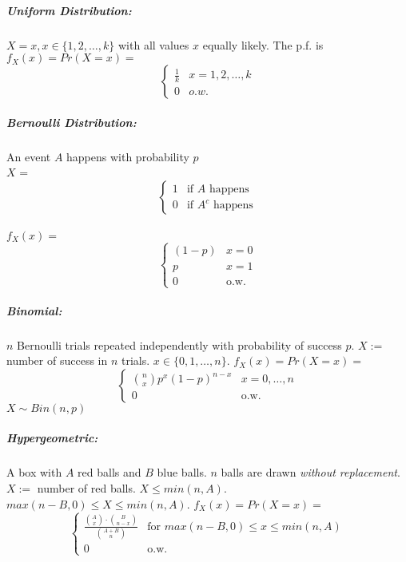 \documentclass{article}[10pt]
\begin{document}
\begin{multicols}{2}
            \subparagraph*{Uniform Distribution: }
                $X = x, x \in \{1, 2, \ldots, k\}$ with all values $x$ equally likely. The p.f. is $f_X(x) = Pr(X=x) = $\[ \begin{cases} \frac      {1}{k} & x = 1, 2, \ldots, k \\
                0 & o.w. \end{cases}
                    \]
            \subparagraph*{Bernoulli Distribution: }
                An event $A$ happens with probability $p$ \\
            $X$ = \[ \begin{cases} 1 & \text{if $A$ happens} \\ 0 & \text{if $A^c$ happens} \end{cases} \] \\
                $f_X(x) =$ \[ 
                    \begin{cases} 
                        (1-p)   & x = 0 \\ 
                        p       & x = 1 \\
                        0       & \text{o.w.} 
                    \end{cases} \]
            \subparagraph*{Binomial:}
                    $n$ Bernoulli trials repeated independently with probability of success $p$. $X :=$ number of success in $n$ trials. $x \in \{0, 1, \ldots, n\}$. $f_X(x) = Pr(X=x) =$
                    \[
                        \begin{cases}
                            {n \choose x} p^x (1-p)^{n-x}   &   x=0, \ldots, n \\
                            0                               &   \text{o.w.}
                        \end{cases}
                        \]
                        $X \sim Bin(n,p)$
            \subparagraph*{Hypergeometric: }
                    A box with $A$ red balls and $B$ blue balls. $n$ balls are drawn \textit{without replacement}. $X :=$ number of red balls. $X \leq min(n, A)$. $max(n-B, 0) \leq X \leq min(n,A)$. $f_X(x) = Pr(X=x) =$ \[
                        \begin{cases}
                            \frac{ {A \choose x} \cdot {B \choose n - x}}{{A + B \choose n}}     &   \text{for } max(n-B,0) \leq x \leq min(n,A) \\
                            0   &   \text{o.w.}
                        \end{cases}
                    \]
            

\end{multicols}
\end{document}
